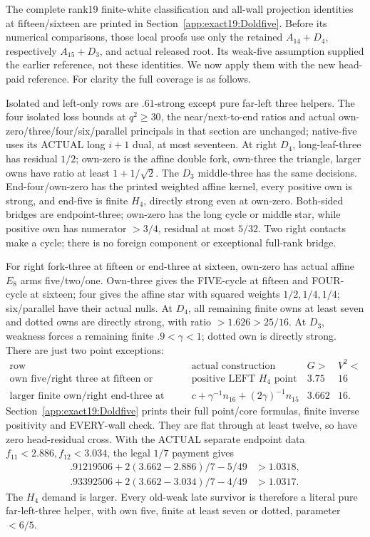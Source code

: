 \documentclass[11pt]{article}
\theoremstyle{definition}
\theoremstyle{remark}
\begin{document}
The complete rank19 finite-white classification and all-wall
projection identities at fifteen/sixteen are printed in
Section~\ref{app:exact19:Doldfive}.
Before its numerical comparisons, those local proofs use only the
retained \(A_{14}+D_4\), respectively \(A_{15}+D_3\), and actual released
root. Its weak-five assumption supplied the earlier reference, not
these identities. We now apply them with the new head-paid reference.
For clarity the full coverage is as follows.

Isolated and left-only rows are \(.61\)-strong except pure far-left
three helpers. The four isolated loss bounds at \(q^2\ge30\), the
near/next-to-end ratios and actual own-zero/three/four/six/parallel
principals in that section are unchanged; native-five uses its ACTUAL
long \(i+1\) dual, at most seventeen.
At right \(D_4\), long-leaf-three has residual \(1/2\);
own-zero is the affine double fork, own-three the triangle, larger
owns have ratio at least \(1+1/\sqrt2\).
The \(D_3\) middle-three has the same decisions.
End-four/own-zero has the printed weighted affine kernel, every
positive own is strong, and end-five is finite \(H_4\), directly strong
even at own-zero.
Both-sided bridges are endpoint-three; own-zero has the long cycle or
middle star, while positive own has numerator \(>3/4\), residual
at most \(5/32\).
Two right contacts make a cycle; there is no foreign component or
exceptional full-rank bridge.

For right fork-three at fifteen or end-three at sixteen, own-zero has
actual affine \(E_8\) arms five/two/one.
Own-three gives the FIVE-cycle at fifteen and FOUR-cycle at sixteen;
four gives the affine star with squared weights \(1/2,1/4,1/4\);
six/parallel have their actual nulls.
At \(D_4\), all remaining finite owns at least seven and dotted owns
are directly strong, with ratio \(>1.626>25/16\).
At \(D_3\), weakness forces a remaining finite \(.9<\gamma<1\);
dotted own is directly strong.
There are just two point exceptions:
\[
\begin{array}{c|c|c|c}
 \text{row}&\text{actual construction}&G>&V^2<\\ \hline
 \text{own five/right three at fifteen or sixteen}
            &\text{positive LEFT }H_4\text{ point}&3.75&16\\
 \text{larger finite own/right end-three at sixteen}
            &c+\gamma^{-1}n_{16}+(2\gamma)^{-1}n_{15}&3.662&16 .
\end{array}
\]
Section~\ref{app:exact19:Doldfive} prints their full point/core
formulas, finite inverse positivity and EVERY-wall check.
They are flat through at least twelve, so have zero head-residual
cross. With the ACTUAL separate endpoint data
\(f_{11}<2.886,f_{12}<3.034\), the legal \(1/7\) payment gives
\[
\begin{split}
 .91219506+2(3.662-2.886)/7-5/49&>1.0318,\\
 .93392506+2(3.662-3.034)/7-4/49&>1.0317 .
\end{split}
\]
The \(H_4\) demand is larger.
Every old-weak late survivor is therefore a literal pure far-left-three
helper, with own five, finite at least seven or dotted, parameter \(<6/5\).
\end{document}

